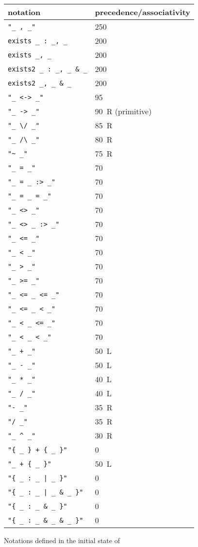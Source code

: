 \begin{figure}
\label{coq-symbols}
\begin{center}
\begin{tabular}{|l|l|}
\hline
notation & precedence/associativity \\
\hline
\verb$"_ , _"$ & 250 \\
\verb$exists _ : _, _$ & 200 \\
\verb$exists _, _$ & 200 \\
\verb$exists2 _ : _, _ & _$ & 200 \\
\verb$exists2 _, _ & _$ & 200 \\
\verb$"_ <-> _"$ & 95 \\
\verb$"_ -> _"$ & 90\, R (primitive) \\
\verb$"_ \/ _"$ & 85\, R \\
\verb$"_ /\ _"$ & 80\, R \\
\verb$"~ _"$    & 75\, R \\
\verb$"_ = _"$  & 70 \\
\verb$"_ = _ :> _"$  & 70 \\
\verb$"_ = _ = _"$  & 70 \\
\verb$"_ <> _"$  & 70 \\
\verb$"_ <> _ :> _"$  & 70 \\
\verb$"_ <= _"$ & 70 \\
\verb$"_ < _"$  & 70 \\
\verb$"_ > _"$  & 70 \\
\verb$"_ >= _"$ & 70 \\
\verb$"_ <= _ <= _"$ & 70 \\
\verb$"_ <= _ < _"$ & 70 \\
\verb$"_ < _ <= _"$ & 70 \\
\verb$"_ < _ < _"$ & 70 \\
\verb$"_ + _"$  & 50\, L \\
\verb$"_ - _"$  & 50\, L \\
\verb$"_ * _"$  & 40\, L \\
\verb$"_ / _"$  & 40\, L \\
\verb$"- _"$  & 35\, R \\
\verb$"/ _"$  & 35\, R \\
\verb$"_ ^ _"$  & 30\, R \\
\verb$"{ _ } + { _ }"$ & 0 \\
\verb$"_ + { _ }"$  & 50\, L \\
\verb$"{ _ : _ | _ }"$ & 0 \\
\verb$"{ _ : _ | _ & _ }"$ & 0 \\
\verb$"{ _ : _ & _ }"$ & 0 \\
\verb$"{ _ : _ & _ & _ }"$ & 0 \\
\hline
\end{tabular}
\end{center}
\caption{Notations defined in the initial state of {\Coq}}
\end{figure}


